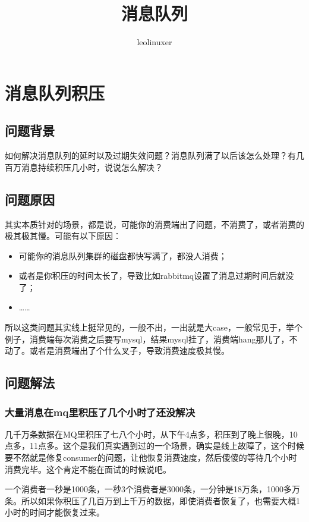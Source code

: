 \documentclass[12pt]{article}
\title{消息队列}
\author{leolinuxer}
\begin{document}
\maketitle
\tableofcontents

\section{消息队列积压\cite{Message_Queue_Accident}}
\subsection{问题背景}
如何解决消息队列的延时以及过期失效问题？消息队列满了以后该怎么处理？有几百万消息持续积压几小时，说说怎么解决？


\subsection{问题原因}
其实本质针对的场景，都是说，可能你的消费端出了问题，不消费了，或者消费的极其极其慢。可能有以下原因：
\begin{itemize}
\setlength{\itemsep}{0pt}
\setlength{\parsep}{0pt}
\setlength{\parskip}{0pt}
    \item 可能你的消息队列集群的磁盘都快写满了，都没人消费；
    \item 或者是你积压的时间太长了，导致比如rabbitmq设置了消息过期时间后就没了；
    \item ……
\end{itemize}

所以这类问题其实线上挺常见的，一般不出，一出就是大case，一般常见于，举个例子，消费端每次消费之后要写mysql，结果mysql挂了，消费端hang那儿了，不动了。或者是消费端出了个什么叉子，导致消费速度极其慢。

\subsection{问题解法}
\subsubsection{大量消息在mq里积压了几个小时了还没解决}
几千万条数据在MQ里积压了七八个小时，从下午4点多，积压到了晚上很晚，10点多，11点多。这个是我们真实遇到过的一个场景，确实是线上故障了，这个时候要不然就是修复consumer的问题，让他恢复消费速度，然后傻傻的等待几个小时消费完毕。这个肯定不能在面试的时候说吧。

一个消费者一秒是1000条，一秒3个消费者是3000条，一分钟是18万条，1000多万条。所以如果你积压了几百万到上千万的数据，即使消费者恢复了，也需要大概1小时的时间才能恢复过来。
\end{document}

